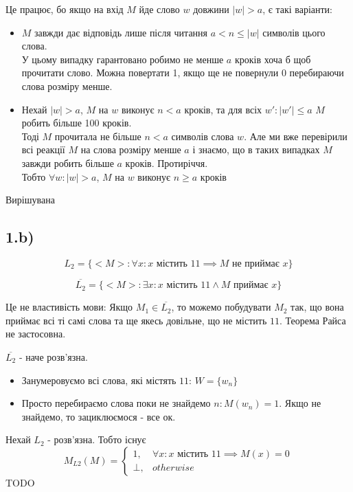 \documentclass[11pt, a4paper]{article} %
\begin{document}
Це працює, бо якщо на вхід $M$ йде слово $w$ довжини $|w|>a$, є такі варіанти:
\begin{itemize}
    \item $M$ завжди дає відповідь лише після читання $a < n \le |w|$ символів цього слова.\\
    У цьому випадку гарантовано робимо не менше $a$ кроків хоча б щоб прочитати слово. 
    Можна повертати 1, якщо ще не повернули 0 перебираючи слова розміру менше.
    \item Нехай $|w| > a$, $M$ на $w$ виконує $n < a$ кроків, та для всіх $w' : |w'|\le a$ $M$ робить більше 100 кроків.\\
    Тоді $M$ прочитала не більше $n < a$ символів слова $w$. 
    Але ми вже перевірили всі реакції $M$ на слова розміру менше $a$ і знаємо, що в таких випадках $M$ завжди робить більше $a$ кроків.
    Протиріччя. \\ Тобто $\forall w: |w| > a$, $M$ на $w$ виконує $n \ge a$ кроків
\end{itemize}

\begin{mdframed}[style=ans]
    Вирішувана
\end{mdframed}

\subsection*{1.b)}
$$L_2 = \{<M> : \forall x: x \text{ містить } 11 \implies M \text{ не приймає } x\}$$

$$\overline{L_2} = \{<M> : \exists x: x \text{ містить } 11 \wedge M \textbf{ приймає } x\}$$

Це не властивість мови:
Якщо $M_1 \in \overline{L_2}$, то можемо побудувати $M_2$ так, що вона приймає всі ті самі слова та ще якесь довільне, що не містить $11$.
Теорема Райса не застосовна.

$\overline{L_2}$ - наче розв'язна.

\begin{itemize}
    \item Занумеровуємо всі слова, які містять $11$: $W=\{w_n\}$
    \item Просто перебираємо слова поки не знайдемо $n: M(w_n) = 1$. 
    Якщо не знайдемо, то зациклюємося - все ок.
\end{itemize}


Нехай $L_2$ - розв'язна. Тобто існує
$$M_{L2}(M) = \begin{cases}
    1, & \forall x: x \text{ містить } 11 \implies M(x)=0\\
    \bot, & otherwise
\end{cases}$$
TODO
\end{document}
